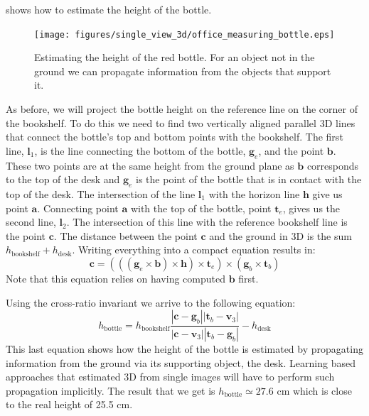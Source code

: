 \Fig{\ref{fig:office_measuring_bottle}} shows how to estimate the height of the bottle. 

\begin{figure}
\centerline{
\texttt{[image: figures/single\_view\_3d/office\_measuring\_bottle.eps]}
} 
\caption{Estimating the height of the red bottle. For an object not in the ground we can propagate information from the objects that support it.}
\label{fig:office_measuring_bottle}
\end{figure}

As before, we will project the bottle height on the reference line on the corner of the bookshelf. To do this we need to find two vertically aligned parallel 3D lines that connect the bottle's top and bottom points with the bookshelf. The first line, $\boldsymbol{l}_1$, is the line connecting the bottom of the bottle, $\mathbf{g}_e$, and the point $\mathbf{b}$. These two points are at the same height from the ground plane as $\mathbf{b}$ corresponds to the top of the desk and $\mathbf{g}_e$ is the point of the bottle that is in contact with the top of the desk. The intersection of the line $\boldsymbol{l}_1$ with the horizon line $\mathbf{h}$ give us point $\mathbf{a}$. Connecting point $\mathbf{a}$ with the top of the bottle, point $\mathbf{t}_e$, gives us the second line, $\boldsymbol{l}_2$. The intersection of this line with the reference bookshelf line is the point $\mathbf{c}$. The distance between the point $\mathbf{c}$ and the ground in 3D is the sum  $h_{\text{bookshelf}}+h_{\text{desk}}$. Writing everything into a compact equation results in:
\begin{equation}
\mathbf{c} = (((\mathbf{g}_e \times \mathbf{b}) \times \mathbf{h}) \times \mathbf{t}_e) \times (\mathbf{g}_b \times \mathbf{t}_b) 
\end{equation}
Note that this equation relies on having computed $\mathbf{b}$ first.

Using the cross-ratio invariant we arrive to the following equation:
\begin{equation}
h_{\text{bottle}} =
h_{\text{bookshelf}}  \frac{\left| \mathbf{c} - \mathbf{g}_b \right| \left| \mathbf{t}_b - \mathbf{v}_3  \right|}{\left| \mathbf{c} - \mathbf{v}_3 \right| \left| \mathbf{t}_b - \mathbf{g}_b \right| }  - h_{\text{desk}}
\end{equation}
This last equation shows how the height of the bottle is estimated by propagating information from the ground via its supporting object, the desk. Learning based approaches that estimated 3D from single images will have to perform such propagation implicitly. The result that we get is $h_{\text{bottle}} \simeq 27.6$ cm which is close to the real height of 25.5 cm.

